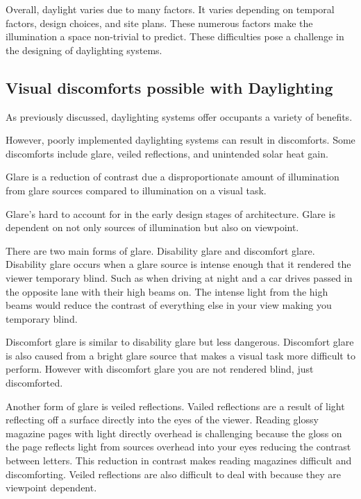 Overall, daylight varies due to many factors. It varies depending on temporal factors, design choices, and site plans. These numerous factors make the illumination a space non-trivial to predict. These difficulties pose a challenge in the designing of daylighting systems.

\subsection{Visual discomforts possible with Daylighting}
As previously discussed, daylighting systems offer occupants a variety of benefits.

However, poorly implemented daylighting systems can result in discomforts. Some discomforts include glare, veiled reflections, and unintended solar heat gain.

Glare is a reduction of contrast due a disproportionate amount of illumination from glare sources compared to illumination on a visual task.

Glare's hard to account for in the early design stages of architecture. Glare is dependent on not only sources of illumination but also on viewpoint.

There are two main forms of glare. Disability glare and discomfort glare.
Disability glare occurs when a glare source is intense enough that it rendered the viewer temporary blind. Such as when driving at night and a car drives passed in the opposite lane with their high beams on. The intense light from the high beams would reduce the contrast of everything else in your view making you temporary blind.

Discomfort glare is similar to disability glare but less dangerous. Discomfort glare is also caused from a bright glare source that makes a visual task more difficult to perform. However with discomfort glare you are not rendered blind, just discomforted.

Another form of glare is veiled reflections.
Vailed reflections are a result of light reflecting off a surface directly into the eyes of the viewer. Reading glossy magazine pages with light directly overhead is challenging because the gloss on the page reflects light from sources overhead into your eyes reducing the contrast between letters. This reduction in contrast makes reading magazines difficult and discomforting.
Veiled reflections are also difficult to deal with because they are viewpoint dependent.

